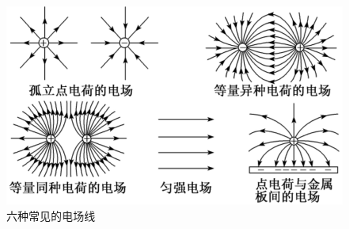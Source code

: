 \begin{figure}[H]
  \centering
  \includegraphics{./dianchang/dianchang1.png}
  \caption{六种常见的电场线}
  \label{fig:dianchangxian}
\end{figure}

